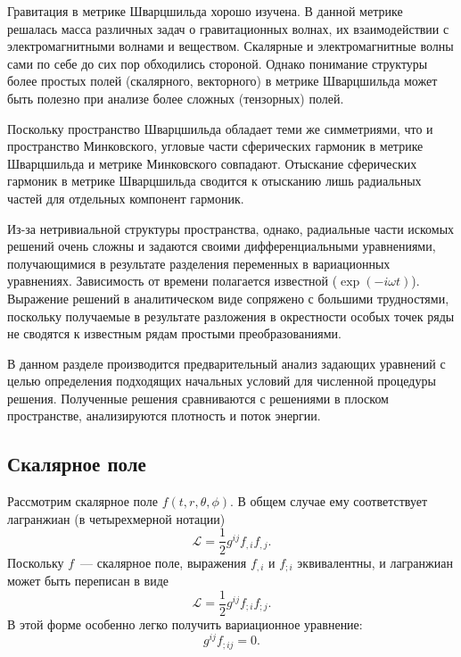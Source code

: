\documentclass[\docroot/reports/draft/report.tex]{subfiles}
\begin{document}
\onlyinsubfile{\tableofcontents}

Гравитация в метрике Шварцшильда хорошо изучена. В данной метрике решалась масса различных задач о гравитационных волнах, их взаимодействии с электромагнитными волнами и веществом. Скалярные и электромагнитные волны сами по себе до сих пор обходились стороной. Однако понимание структуры более простых полей (скалярного, векторного) в метрике Шварцшильда может быть полезно при анализе более сложных (тензорных) полей.

Поскольку пространство Шварцшильда обладает теми же симметриями, что и пространство Минковского, угловые части сферических гармоник в метрике Шварцшильда и метрике Минковского совпадают. Отыскание сферических гармоник в метрике Шварцшильда сводится к отысканию лишь радиальных частей для отдельных компонент гармоник.

Из-за нетривиальной структуры пространства, однако, радиальные части искомых решений очень сложны и задаются своими дифференциальными уравнениями, получающимися в результате разделения переменных в вариационных уравнениях. Зависимость от времени полагается известной ($\exp(- i \omega t)$). Выражение решений в аналитическом виде сопряжено с большими трудностями, поскольку получаемые в результате разложения в окрестности особых точек ряды не сводятся к известным рядам простыми преобразованиями.

В данном разделе производится предварительный анализ задающих уравнений с целью определения подходящих начальных условий для численной процедуры решения. Полученные решения сравниваются с решениями в плоском пространстве, анализируются плотность и поток энергии.

\subsection{Скалярное поле}\label{sec:scal}

    Рассмотрим скалярное поле $f(t,r,\theta,\phi)$. В общем случае ему соответствует лагранжиан (в четырехмерной нотации)
    \begin{equation*}
        \mathcal{L} = \frac{1}{2} g^{ij} f_{,i} f_{,j}.
    \end{equation*}
    Поскольку $f$~--- скалярное поле, выражения $f_{,i}$ и $f_{;i}$ эквивалентны, и лагранжиан может быть переписан в виде
    \begin{equation*}
        \mathcal{L} = \frac{1}{2} g^{ij} f_{;i} f_{;j}.
    \end{equation*}
    В этой форме особенно легко получить вариационное уравнение:
    \begin{equation*}
        g^{ij} f_{;ij} = 0.
    \end{equation*}
\end{document}
